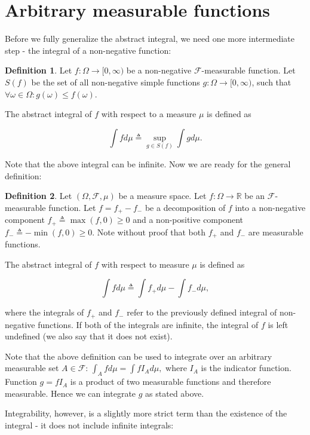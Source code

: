 \documentclass{book}
\theoremstyle{plain}%
\theoremstyle{definition}
\newtheorem{definition}{Definition}[section]
\newlength{\arrow}
\begin{document}
\section{Arbitrary measurable functions}

Before we fully generalize the abstract integral, we need one more intermediate step - the integral of a non-negative function:

\begin{definition}
Let $f: \Omega \rightarrow [0, \infty)$ be a non-negative $\mathcal{F}$-measurable function. Let $S(f)$ be the set of all non-negative simple functions $g: \Omega \rightarrow [0, \infty)$, such that $\forall \omega \in \Omega: g(\omega) \leq f(\omega)$.

The abstract integral of $f$ with respect to a measure $\mu$ is defined as

$$\int f d\mu \triangleq \sup_{g \in S(f)} \int g d\mu.$$
\end{definition}

Note that the above integral can be infinite. Now we are ready for the general definition:

\begin{definition}
Let $(\Omega, \mathcal{F}, \mu)$ be a measure space. Let $f: \Omega \rightarrow \mathbb{R}$ be an $\mathcal{F}$-measurable function. Let $f = f_+ - f_-$ be a decomposition of $f$ into a non-negative component $f_+ \triangleq \max(f,0) \geq 0$ and a non-positive component $f_- \triangleq -\min(f,0) \geq 0$. Note without proof that both $f_+$ and $f_-$ are measurable functions.

The abstract integral of $f$ with respect to measure $\mu$ is defined as

$$\int f d\mu \triangleq \int f_+ d\mu - \int f_- d\mu,$$

where the integrals of $f_+$ and $f_-$ refer to the previously defined integral of non-negative functions. If both of the integrals are infinite, the integral of $f$ is left undefined (we also say that it does not exist).
\end{definition}

Note that the above definition can be used to integrate over an arbitrary measurable set $A \in \mathcal{F}$: $\int_A f d\mu = \int fI_A d\mu,$ where $I_A$ is the indicator function. Function $g = fI_A$ is a product of two measurable functions and therefore measurable. Hence we can integrate $g$ as stated above.

Integrability, however, is a slightly more strict term than the existence of the integral - it does not include infinite integrals:
\end{document}
